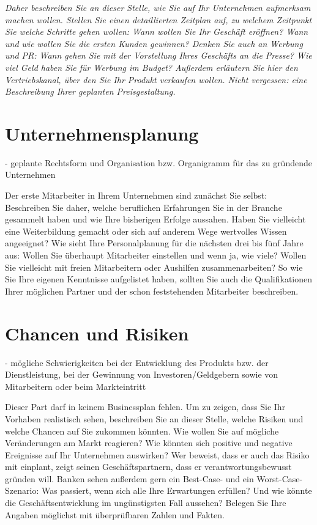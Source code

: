 \documentclass[12pt, a4paper]{article} %
\begin{document}
\emph{Daher beschreiben Sie an dieser Stelle, wie Sie auf Ihr Unternehmen aufmerksam machen wollen. Stellen Sie einen detaillierten Zeitplan auf, zu welchem Zeitpunkt Sie welche Schritte gehen wollen: Wann wollen Sie Ihr Geschäft eröffnen? Wann und wie wollen Sie die ersten Kunden gewinnen? Denken Sie auch an Werbung und PR: Wann gehen Sie mit der Vorstellung Ihres Geschäfts an die Presse? Wie viel Geld haben Sie für Werbung im Budget? Außerdem erläutern Sie hier den Vertriebskanal, über den Sie Ihr Produkt verkaufen wollen. Nicht vergessen: eine Beschreibung Ihrer geplanten Preisgestaltung.}


\newpage


\section{Unternehmensplanung}
- geplante Rechtsform und Organisation bzw. Organigramm für das zu gründende Unternehmen

Der erste Mitarbeiter in Ihrem Unternehmen sind zunächst Sie selbst: Beschreiben Sie daher, welche beruflichen Erfahrungen Sie in der Branche gesammelt haben und wie Ihre bisherigen Erfolge aussahen. Haben Sie vielleicht eine Weiterbildung gemacht oder sich auf anderem Wege wertvolles Wissen angeeignet? Wie sieht Ihre Personalplanung für die nächsten drei bis fünf Jahre aus: Wollen Sie überhaupt Mitarbeiter einstellen und wenn ja, wie viele? Wollen Sie vielleicht mit freien Mitarbeitern oder Aushilfen zusammenarbeiten? So wie Sie Ihre eigenen Kenntnisse aufgelistet haben, sollten Sie auch die Qualifikationen Ihrer möglichen Partner und der schon feststehenden Mitarbeiter beschreiben.

\newpage

\section{Chancen und Risiken}
- mögliche Schwierigkeiten bei der Entwicklung des Produkts bzw. der Dienstleistung, bei der Gewinnung von Investoren/Geldgebern sowie von Mitarbeitern oder beim Markteintritt 

Dieser Part darf in keinem Businessplan fehlen. Um zu zeigen, dass Sie Ihr Vorhaben realistisch sehen, beschreiben Sie an dieser Stelle, welche Risiken und welche Chancen auf Sie zukommen könnten. Wie wollen Sie auf mögliche Veränderungen am Markt reagieren? Wie könnten sich positive und negative Ereignisse auf Ihr Unternehmen auswirken? Wer beweist, dass er auch das Risiko mit einplant, zeigt seinen Geschäftspartnern, dass er verantwortungsbewusst gründen will. Banken sehen außerdem gern ein Best-Case- und ein Worst-Case-Szenario: Was passiert, wenn sich alle Ihre Erwartungen erfüllen? Und wie könnte die Geschäftsentwicklung im ungünstigsten Fall aussehen? Belegen Sie Ihre Angaben möglichst mit überprüfbaren Zahlen und Fakten.
\end{document}
